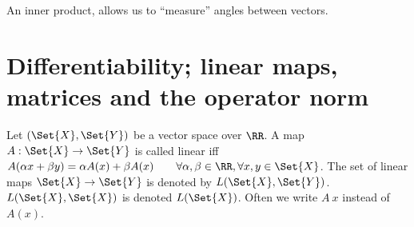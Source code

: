 \begin{rem}
 An inner product, allows us to ``measure'' angles between vectors.
\end{rem}
\section[Differentiability]{Differentiability; linear maps, matrices and the operator norm}
\begin{defn}
 Let $(\Set{X},\Set{Y})$ be a vector space over $\RR$. A map $A:\Set{X}\to\Set{Y}$ is called linear iff $A(\alpha x+\beta y)=\alpha A(x)+\beta A(x)\qquad \forall \alpha, \beta\in\RR, \forall x,y\in\Set{X}$. The set of linear maps $\Set{X}\to\Set{Y}$ is denoted by $L(\Set{X}, \Set{Y})$. $L(\Set{X},\Set{X})$ is denoted $L(\Set{X})$. Often we write $A\ x$ instead of $A(x)$. 
\end{defn}
